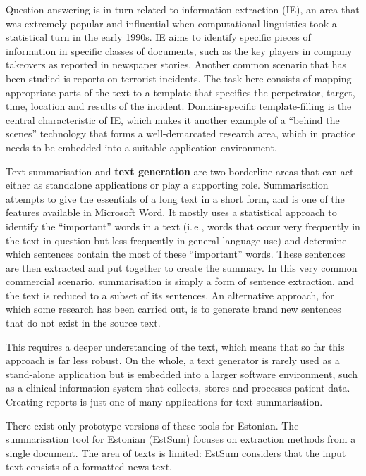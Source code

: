 \documentclass[]{../metanetpaper}
\begin{document}
\begin{multicols}{2}
Question answering is in turn related to information extraction (IE), an area that was extremely popular and influential when computational linguistics took a statistical turn in the early 1990s. IE aims to identify specific pieces of information in specific classes of documents, such as the key players in company takeovers as reported in newspaper stories. Another common scenario that has been studied is reports on terrorist incidents. The task here consists of mapping appropriate parts of the text to a template that specifies the perpetrator, target, time, location and results of the incident. Domain-specific template-filling is the central characteristic of IE, which makes it another example of a ``behind the scenes'' technology that forms a well-demarcated research area, which in practice needs to be embedded into a suitable application environment. 

    Text summarisation and \textbf{text generation} are two borderline areas that can act either as standalone applications or play a supporting role. Summarisation attempts to give the essentials of a long text in a short form, and is one of the features available in Microsoft Word. It mostly uses a statistical approach to identify the ``important'' words in a text (i.\,e., words that occur very frequently in the text in question but less frequently in general language use) and determine which sentences contain the most of these ``important'' words. These sentences are then extracted and put together to create the summary. In this very common commercial scenario, summarisation is simply a form of sentence extraction, and the text is reduced to a subset of its sentences. An alternative approach, for which some research has been carried out, is to generate brand new sentences that do not exist in the source text. 

This requires a deeper understanding of the text, which means that so far this approach is far less robust. On the whole, a text generator is rarely used as a stand-alone application but is embedded into a larger software environment, such as a clinical information system that collects, stores and processes patient data. Creating reports is just one of many applications for text summarisation. 

There exist only prototype versions of these tools for Estonian. 
The summarisation tool for Estonian (EstSum) focuses on extraction methods from a single document. 
The area of texts is limited: EstSum considers that the input text consists of a formatted news text. 


\end{multicols}
\end{document}
